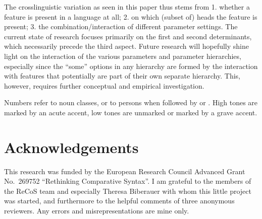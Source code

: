 \documentclass[output=paper]{langsci/langscibook}
\begin{document}
The crosslinguistic variation as seen in this paper thus stems from 1. whether
a feature is present in a language at all; 2. on which (subset of) heads the
feature is present; 3. the combination/interaction of different parameter
settings. The current state of research focuses primarily on the first and
second determinants, which necessarily precede the third aspect. Future
research will hopefully shine light on the interaction of the various
parameters and parameter hierarchies, especially since the \enquote{some} options in
any hierarchy are formed by the interaction with features that potentially are
part of their own separate hierarchy. This, however, requires further
conceptual and empirical investigation.

\printchapterglossary{}

\noindent Numbers refer to noun classes, or to persons when followed by \Sg{}
or \Pl{}.  High tones are marked by an acute accent, low tones are unmarked or
marked by a grave accent.

\section*{Acknowledgements}

This research was funded by the European Research Council Advanced Grant No.\
269752 \enquote{Rethinking Comparative Syntax}. I am grateful to the members of
the ReCoS team and especially Theresa Biberauer with whom this little project
was started, and furthermore to the helpful comments of three anonymous
reviewers.  Any errors and misrepresentations are mine only.

{\sloppy
\printbibliography[heading=subbibliography,notkeyword=this]
}
\end{document}
